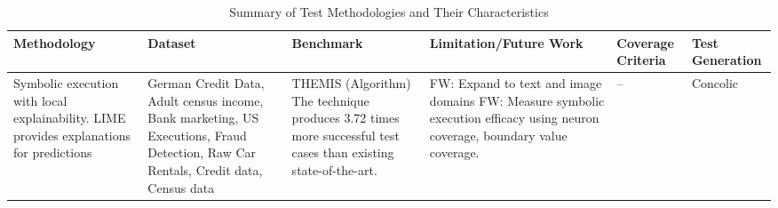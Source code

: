 \begin{landscape}
    \begin{xltabular}{\linewidth}{|>{\raggedright\arraybackslash}X|>{\raggedright\arraybackslash}X|>{\raggedright\arraybackslash}p{3.5cm}|>{\raggedright\arraybackslash}p{6cm}|>{\raggedright\arraybackslash}p{2.5cm}|>{\raggedright\arraybackslash}p{3cm}|} %
    \caption{Summary of Test Methodologies and Their Characteristics} \\
    \hline
    \textbf{Methodology} & \textbf{Dataset} & \textbf{Benchmark} & \textbf{Limitation/Future Work} & \textbf{Coverage Criteria} & \textbf{Test Generation} \\ \endhead
    
    Symbolic execution with local explainability. LIME provides explanations for predictions\cite{Agarwal} & German Credit Data, Adult census income, Bank marketing, US Executions, Fraud Detection, Raw Car Rentals, Credit data, Census data & THEMIS (Algorithm) The technique produces 3.72 times more successful test cases than existing state-of-the-art. & FW: Expand to text and image domains FW: Measure symbolic execution efficacy using neuron coverage, boundary value coverage. & -- & Concolic \\ \hline
    

\end{xltabular}
\end{landscape}
